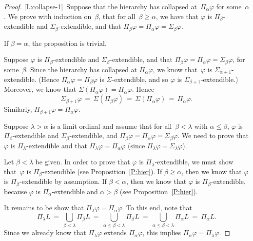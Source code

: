 \documentclass[main.tex]{subfiles}
\begin{document}
\begin{proof}
\noindent\ref{L:collapse-1}\ 
Suppose that the hierarchy has collapsed at~$\Pi_\alpha\varphi$
for some~$\alpha$.
We prove with induction on~$\beta$,
that for all~$\beta\geq \alpha$,
we have that
$\varphi$
is $\Pi_\beta$-extendible and $\Sigma_\beta$-extendible,
and that  $\Pi_\beta\varphi = \Pi_\alpha\varphi = \Sigma_\beta \varphi$.

If $\beta=\alpha$, the proposition is trivial.

Suppose $\varphi$ is $\Pi_\beta$-extendible
and $\Sigma_\beta$-extendible,
and that $\Pi_\beta\varphi = \Pi_\alpha\varphi = \Sigma_\beta \varphi$,
for some~$\beta$.
Since the hierarchy has collapsed at $\Pi_\alpha\varphi$,
we know that~$\varphi$ is $\Sigma_{\alpha+1}$-extendible.
(Hence $\Pi_\alpha \varphi = \Pi_\beta\varphi$
is $\Sigma$-extendible,
and so $\varphi$ is $\Sigma_{\beta+1}$-extendible.)
Moreover, we know that $\Sigma(\Pi_\alpha\varphi)=\Pi_\alpha\varphi$.
Hence  
\begin{equation*}
\Sigma_{\beta+1} \varphi \,=\, \Sigma(\Pi_\beta \varphi)
\,=\, \Sigma(\Pi_\alpha\varphi) \,=\, \Pi_\alpha\varphi.
\end{equation*}
Similarly, $\Pi_{\beta+1} \varphi = \Pi_\alpha\varphi$.

Suppose $\lambda > \alpha$ is a limit ordinal
and assume that
for all~$\beta<\lambda$ with $\alpha\leq\beta$,
$\varphi$ is $\Pi_\beta$-extendible
and $\Sigma_\beta$-extendible,
and $\Pi_\beta\varphi = \Pi_\alpha\varphi = \Sigma_\beta\varphi$.
We need to prove that $\varphi$ is $\Pi_\lambda$-extendible
and that $\Pi_\lambda \varphi = \Pi_\alpha \varphi$
(since $\Pi_\lambda \varphi = \Sigma_\lambda\varphi$).

Let $\beta<\lambda$ be given.
In order to prove that $\varphi$ is $\Pi_\lambda$-extendible,
we must show that~$\varphi$ is $\Pi_\beta$-extendible 
(see Proposition~\ref{P:hier}).
If $\beta\geq \alpha$,
then we know that $\varphi$ is $\Pi_\beta$-extendible by assumption.
If $\beta< \alpha$,
then we know that $\varphi$ is $\Pi_\beta$-extendible,
because $\varphi$ is $\Pi_\alpha$-extendible and $\alpha> \beta$
(see Proposition~\ref{P:hier}).

It remains to be show that $\Pi_\lambda \varphi = \Pi_\alpha \varphi$.
To this end, note that
\begin{equation*}
\Pi_\lambda L \ =\  \textstyle{\bigcup_{\beta<\lambda} \Pi_\beta L}
\ =\  \textstyle{\bigcup_{\alpha\leq\beta<\lambda} \Pi_\beta L }
\ =\  \textstyle{\bigcup_{\alpha\leq\beta<\lambda} \Pi_\alpha L }
\ =\  \Pi_\alpha L.
\end{equation*}
Since we already know that $\Pi_\lambda \varphi$
extends $\Pi_\alpha \varphi$,
this implies $\Pi_\alpha \varphi = \Pi_\lambda\varphi$.


\end{proof}
\end{document}
